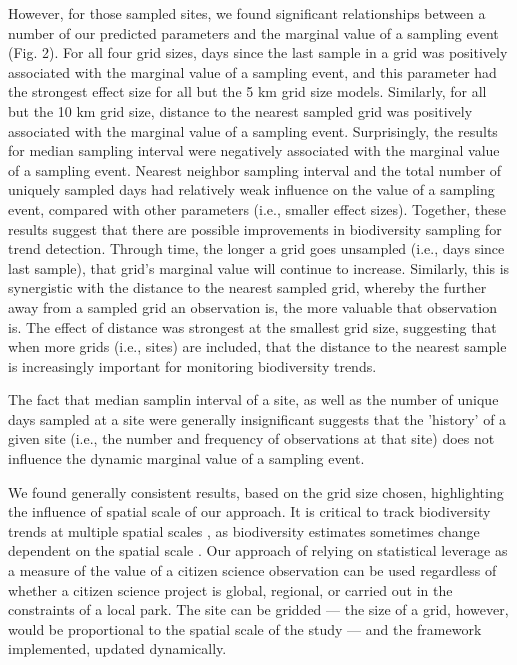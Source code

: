 \documentclass[9pt,twocolumn,twoside,lineno]{pnas-new}
\begin{document}
However, for those sampled sites, we found significant relationships between a number of our predicted parameters and the marginal value of a sampling event (Fig. 2). For all four grid sizes, days since the last sample in a grid was positively associated with the marginal value of a sampling event, and this parameter had the strongest effect size for all but the 5 km grid size models. Similarly, for all but the 10 km grid size, distance to the nearest sampled grid was positively associated with the marginal value of a sampling event. Surprisingly, the results for median sampling interval were negatively associated with the marginal value of a sampling event. Nearest neighbor sampling interval and the total number of uniquely sampled days had relatively weak influence on the value of a sampling event, compared with other parameters (i.e., smaller effect sizes). Together, these results suggest that there are possible improvements in biodiversity sampling for trend detection. Through time, the longer a grid goes unsampled (i.e., days since last sample), that grid's marginal value will continue to increase. Similarly, this is synergistic with the distance to the nearest sampled grid, whereby the further away from a sampled grid an observation is, the more valuable that observation is. The effect of distance was strongest at the smallest grid size, suggesting that when more grids (i.e., sites) are included, that the distance to the nearest sample is increasingly important for monitoring biodiversity trends.

The fact that median samplin interval of a site, as well as the number of unique days sampled at a site were generally insignificant suggests that the 'history' of a given site (i.e., the number and frequency of observations at that site) does not influence the dynamic marginal value of a sampling event.

We found generally consistent results, based on the grid size chosen, highlighting the influence of spatial scale of our approach. It is critical to track biodiversity trends at multiple spatial scales \cite{soberon2007assessing}, as biodiversity estimates sometimes change dependent on the spatial scale \cite{chase2013scale}. Our approach of relying on statistical leverage as a measure of the value of a citizen science observation can be used regardless of whether a citizen science project is global, regional, or carried out in the constraints of a local park. The site can be gridded --- the size of a grid, however, would be proportional to the spatial scale of the study --- and the framework implemented, updated dynamically.
\end{document}

